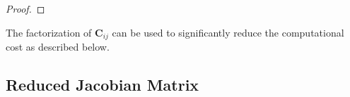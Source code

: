 \documentclass{vgtc}                          %
\begin{document}
\begin{proof}
\end{proof}

The factorization of $\mathbf{C}_{ij}$ can be used to  significantly reduce the computational cost as described below.

\subsection{Reduced Jacobian Matrix }
\end{document}

